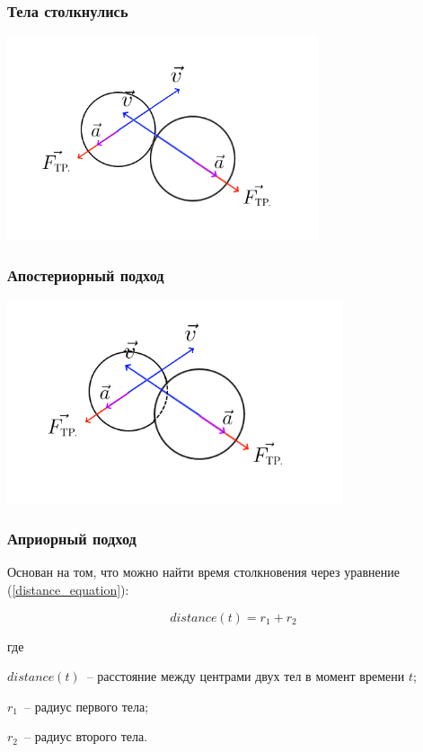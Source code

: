 \documentclass[xetex,aspectratio=43]{beamer}
\newenvironment{Underequation}{
    \small
    \noindent
    где
    \hspace{-1.45ex}
    \setlength{\parindent}{3.5ex}
}{}
\begin{document}
\begin{frame}
    \frametitle{Тела столкнулись}

    \includegraphics[height=6cm]{body_collision}

\end{frame}

\begin{frame}
    \frametitle{Апостериорный подход}

    \includegraphics[height=6cm]{body_aposteriori}
\end{frame}

\begin{frame}
    \frametitle{Априорный подход}

    Основан на том, что можно найти время столкновения через уравнение (\ref{distance_equation}):

    \begin{equation}\label{distance_equation}
        distance(t) = r_1 + r_2
    \end{equation}

    \begin{Underequation}
        \(distance(t)\)~-- расстояние между центрами двух тел в момент времени \(t\);

        \(r_1\)~-- радиус первого тела;

        \(r_2\)~-- радиус второго тела.
    \end{Underequation}

\end{frame}
\end{document}
